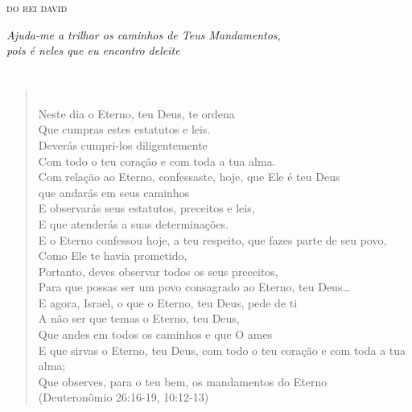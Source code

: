 \chapter*{}
\thispagestyle{empty}
\begin{flushright}
\begin{vplace}[30]
\textsc{do rei david}

\emph{Ajuda-me a trilhar os caminhos de Teus Mandamentos,\\ pois é neles
que eu encontro deleite}
\end{vplace}
\end{flushright}

\chapter*{}
\thispagestyle{empty}
\begin{verse}
\\[10pt]

Neste dia o Eterno, teu Deus, te ordena\\
Que cumpras estes estatutos e leis.\\
Deverás cumpri-los diligentemente\\
Com todo o teu coração e com toda a tua alma.\\[10pt]

Com relação ao Eterno, confessaste, hoje, que Ele é teu \qb{}Deus\\
que andarás em seus caminhos\\
E observarás seus estatutos, preceitos e leis,\\
E que atenderás a suas determinações.\\[10pt]
 
E o Eterno confessou hoje, a teu respeito, que fazes parte \qb{}de seu povo,\\
Como Ele te havia prometido,\\
Portanto, deves observar todos os seus preceitos,\\
Para que possas ser um povo consagrado ao Eterno, teu \qb{}Deus\ldots{}\\[10pt]

E agora, Israel, o que o Eterno, teu Deus, pede de ti\\
A não ser que temas o Eterno, teu Deus,\\[10pt]

Que andes em todos os caminhos e que O ames\\
E que sirvas o Eterno, teu Deus, com todo o teu coração e \qb{}com toda a tua alma;\\
Que observes, para o teu bem, os mandamentos do Eterno\\\bigskip
\hfill{}(Deuteronômio 26:16-19, 10:12-13) 
\end{verse}


